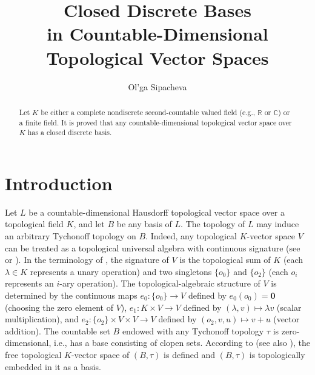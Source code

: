 \documentclass[a4paper]{amsart}
\theoremstyle{definition}
\begin{document}
{
\renewcommand*{\thefootnote}{$\star$}

\title[Closed Discrete Bases in Countable-Dimensional TVS]{Closed Discrete Bases\\in Countable-Dimensional\\ Topological Vector Spaces}

}

\author{Ol'ga Sipacheva}

\begin{abstract}
Let $K$ be either a complete nondiscrete second-countable valued field (e.g., $\mathbb R$ or $\mathbb C$) 
or a finite field. 
It is proved that any countable-dimensional topological vector space over $K$ has a closed 
discrete basis. 
\end{abstract}



\address{Department of General Topology and Geometry, Faculty of Mechanics and  Mathematics, 
M.~V.~Lomonosov Moscow State University, Leninskie Gory 1, Moscow, 199991 Russia}


\maketitle

\section{Introduction}

Let $L$ be a countable-dimensional Hausdorff topological vector space over a topological field $K$, 
and let $B$ be any basis of $L$. The topology of $L$ may induce an arbitrary Tychonoff topology on $B$. Indeed, 
any topological $K$-vector space $V$ can be treated as a topological universal algebra with continuous signature 
(see \cite{Choban} or \cite{Choban2}). In the terminology of \cite{Choban2}, the signature of $V$ is the 
topological sum of $K$ (each $\lambda\in K$ represents a unary operation) and two singletons $\{o_0\}$ and 
$\{o_2\}$ (each $o_i$ represents an $i$-ary operation). The topological-algebraic structure of $V$ is determined 
by the continuous maps $e_0\colon \{o_0\}\to V$ defined by $e_0(o_0)=\mathbf 0$ (choosing the zero element of $V$), 
$e_1\colon K\times V\to V$ defined by $(\lambda, v)\mapsto \lambda v$ (scalar multiplication), and $e_2\colon 
\{o_2\}\times V\times V\to V$ defined by $(o_2, v, u)\mapsto v+u$ (vector addition). The countable set $B$ 
endowed with any Tychonoff topology $\tau$ is zero-dimensional, i.e., has a base consisting of clopen sets. 
According to \cite[Property~7 on p.~115]{Choban} (see also \cite[Corollary~3.5]{Choban2}), the free topological 
$K$-vector space of $(B,\tau)$ is defined and $(B,\tau)$ is topologically embedded in it as a basis. 
\end{document}
